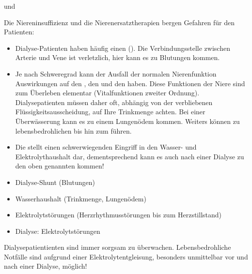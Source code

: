 \TextSlide
{{\TxKomplikationen} und {\TxGefahren}}%
{%
\label{topic:dialysepatienten-gefahren}%
Die Niereninsuffizienz und die Nierenersatztherapien bergen Gefahren für den Patienten: 
%
\begin{itemize}
	\item Dialyse-Patienten haben häufig einen
	 (). 
	Die Verbindungsstelle zwischen Arterie 
	und Vene ist verletzlich,
	hier kann es zu Blutungen kommen.
	\item Je nach Schweregrad kann der Ausfall der normalen Nierenfunktion Auswirkungen
	auf den , 
	den  
	und den  haben.
	Diese Funktionen der Niere sind zum
	Überleben elementar (Vitalfunktionen zweiter Ordnung).
	Dialysepatienten müssen daher oft,
	abhängig von der verbliebenen Flüssigkeitsausscheidung, 
	auf Ihre Trinkmenge achten. 
	Bei einer Überwässerung kann es zu einem Lungenödem kommen.
	Weiters können 
	zu lebensbedrohlichen 
	bis hin zum 
	führen. 
	\item Die  stellt einen schwerwiegenden
	Eingriff in den Wasser- und Elektrolythaushalt dar, dementsprechend
	kann es auch nach einer Dialyse zu den oben genannten
	  kommen!
\end{itemize}
}%
{%
	\begin{itemize}
		\item Dialyse-Shunt (Blutungen)
		\item Wasserhaushalt (Trinkmenge, Lungenödem)
		\item Elektrolytstörungen (Herzrhythmusstörungen bis zum Herzstillstand)
		\item Dialyse: Elektrolytstörungen
	\end{itemize}
}%


\begin{Danger}
  \item Dialysepatientienten sind immer sorgsam zu
  überwachen. Lebensbedrohliche Notfälle sind aufgrund einer
  Elektrolytentgleisung, besonders unmittelbar vor und nach
  einer Dialyse, möglich!
\end{Danger}






